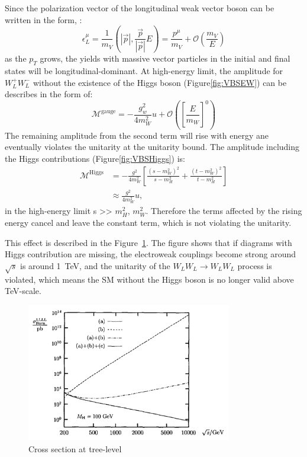 Since the polarization vector of the longitudinal weak vector boson can be written in the form, \cite{Rindani_2009}: 
\begin{equation}
\epsilon_{L}^{\mu}=\frac{1}{m_{V}}\left(|\vec{p}|, \frac{\vec{p}}{|\vec{p}|} E\right)=\frac{p^{\mu}}{m_{V}}+\mathcal{O}\left(\frac{m_{V}}{E}\right)
\end{equation}
as the $p_{T}$ grows, the yields with massive vector particles in the initial and final states will be longitudinal-dominant.
At high-energy limit, the amplitude for $W_L^+W_L^-$ without the existence of the Higgs boson (Figure\ref{fig:VBSEW}) can be describes in the form of:
\begin{equation}
\mathcal{M}^{\text {gauge}}=-\frac{g_{w}^{2}}{4 m_{W}^{2}} u+\mathcal{O}\left(\left[\frac{E}{m_{W}}\right]^{0}\right)
\end{equation}
The remaining amplitude from the second term will rise with energy ane eventually violates the unitarity at the unitarity bound. 
The amplitude including the Higgs contributions (Figure\ref{fig:VBSHiggs}) is:
\begin{equation}
\begin{aligned}
\mathcal{M}^{\text {Higgs}} &=-\frac{g^{2}}{4 m_{W}^{2}}\left[\frac{\left(s-m_{W}^{2}\right)^{2}}{s-m_{H}^{2}}+\frac{\left(t-m_{W}^{2}\right)^{2}}{t-m_{H}^{2}}\right] \\
& \approx \frac{g^{2}}{4 m_{W}^{2}} u,
\end{aligned}
\end{equation}
in the high-energy limit s >> $m_{H}^{2}$, $m_{W}^{2}$.
Therefore the terms affected by the rising energy cancel and leave the constant term, which is not violating the unitarity.

This effect is described in the Figure~\ref{fig:violation}.
The figure shows that if diagrams with Higgs contribution are missing, the electroweak couplings become strong around $\sqrt{s}$ is around 1~TeV, and the unitarity of the $W_LW_L \rightarrow W_LW_L$ process is violated, which means the SM without the Higgs boson is no longer valid above TeV-scale. 

\begin{figure}[tbp]
\begin{center}
 \includegraphics[width=0.80\textwidth,keepaspectratio]{figures/violation}
\caption{
Cross section at tree-level %
}
\label{fig:violation}
\end{center}
\end{figure}

